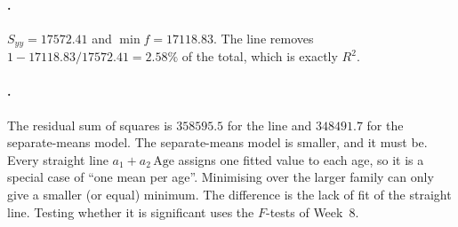 \paragraph{.}
$S_{yy}=17572.41$ and $\min f=17118.83$. The line removes $1-17118.83/17572.41=2.58\%$ of the
total, which is exactly $R^2$.

\paragraph{.}
The residual sum of squares is $358595.5$ for the line and $348491.7$ for the separate-means model.
The separate-means model is smaller, and it must be. Every straight line $a_1+a_2\,\text{Age}$
assigns one fitted value to each age, so it is a special case of ``one mean per age''. Minimising
over the larger family can only give a smaller (or equal) minimum. The difference is the lack of
fit of the straight line. Testing whether it is significant uses the $F$-tests of Week~8.

